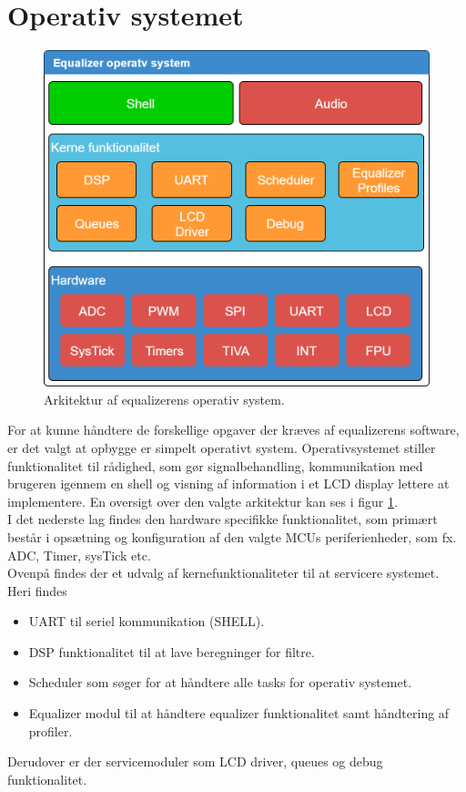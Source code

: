 \section{Operativ systemet}

\begin{figure}[h!]
	\centering
	\includegraphics[width=.5\textwidth]{billeder/eq_os.png}
	\caption{Arkitektur af equalizerens operativ system.}
	\label{fig:eq_os}
\end{figure}

For at kunne håndtere de forskellige opgaver der kræves af equalizerens software, er det valgt at opbygge er simpelt operativt system.
Operativsystemet stiller funktionalitet til rådighed, som gør signalbehandling, kommunikation med brugeren igennem en shell og visning af information i et LCD display lettere at implementere. En oversigt over den valgte arkitektur kan ses i figur \ref{fig:eq_os}.\\

I det nederste lag findes den hardware specifikke funktionalitet, som primært består i opsætning og konfiguration af den valgte MCUs periferienheder, som fx. ADC, Timer, sysTick etc.\\
 
Ovenpå findes der et udvalg af kernefunktionaliteter til at servicere systemet. Heri findes 
\begin{itemize}[noitemsep,nolistsep]
	\item UART til seriel kommunikation (SHELL).
	\item DSP funktionalitet til at lave beregninger for filtre.
	\item Scheduler som søger for at håndtere alle tasks for operativ systemet.
	\item Equalizer modul til at håndtere equalizer funktionalitet samt håndtering af profiler. 
\end{itemize}
Derudover er der servicemoduler som LCD driver, queues og debug funktionalitet.\\

